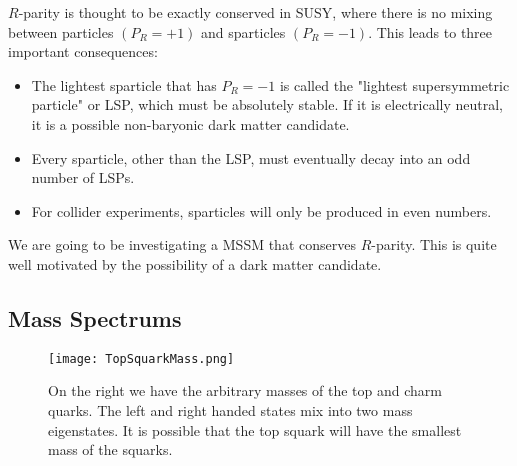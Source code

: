 $R$-parity is thought to be exactly conserved in SUSY, where there is no mixing between particles $(P_R=+1)$ and sparticles $(P_R=-1)$. This leads to three important consequences:
\begin{itemize}
	 \item The lightest sparticle that has $P_R=-1$ is called the "lightest supersymmetric particle" or LSP, which must be absolutely stable. If it is electrically neutral, it is a possible non-baryonic dark matter candidate.
	 \item Every sparticle, other than the LSP, must eventually decay into an odd number of LSPs.
	 \item For collider experiments, sparticles will only be produced in even numbers.
\end{itemize}
 We are going to be investigating a MSSM that conserves $R$-parity. This is quite well motivated by the possibility of a dark matter candidate. 

\subsection{Mass Spectrums}\label{subsec:StopMassSpec}

\begin{figure}
\centering
	\texttt{[image: TopSquarkMass.png]}
 	\caption[Top squark mass hierarchy]{On the right we have the arbitrary masses of the top and charm quarks. The left and right handed states mix into two mass eigenstates. It is possible that the top squark will have the smallest mass of the squarks.}
 	\label{StopMass} 
\end{figure}

